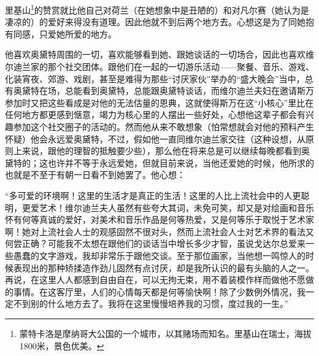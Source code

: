 里基山\footnote{蒙特卡洛是摩纳哥大公国的一个城市，以其赌场而知名。里基山在瑞士，海拔1800米，景色优美。}的赞赏就比他自己对荷兰（在她想象中是丑陋的）和对凡尔赛（她认为是凄凉的）的爱好来得没有道理。因此他就不到后两个地方去。心想这是为了同她抱有同感，只爱她所爱的地方。
\par 他喜欢奥黛特周围的一切，喜欢能够看到她、跟她谈话的一切场合，因此也喜欢维尔迪兰家的那个社交团体。跟他们在一起的一切游乐活动——聚餐、音乐、游戏、化装宵夜、郊游、戏剧，甚至是难得为那些“讨厌家伙”举办的“盛大晚会”当中，总有奥黛特在场，总能看到奥黛特，总能跟奥黛特谈话，而维尔迪兰夫妇在邀请斯万参加时又把这些看成是对他的无法估量的恩典，这就使得斯万在这“小核心”里比在任何地方都更感到惬意，竭力为核心里的人摆出一些好处，心想他这辈子都会有兴趣参加这个社交圈子的活动的。然而他从来不敢想象（怕常想就会对他的预料产生怀疑）他会永远爱奥黛特，不过，假如他一直同维尔迪兰家交往（这种设想，从原则上来说，跟他的理智的抵触要少些），那么他在将来总是可以继续每晚都看到奥黛特的；这也许并不等于永远爱她，但就目前来说，当他还爱她的时候，他所求的也就是不至于有朝一日看不到她罢了。他心想：
\par “多可爱的环境啊！这里的生活才是真正的生活！这里的人比上流社会中的人更聪明，更爱艺术！维尔迪兰夫人虽然有些夸大其词，未免可笑，却又是对绘画和音乐怀有何等真诚的爱好，对美术和音乐作品是何等热爱，又是何等乐于取悦于艺术家啊！她对上流社会人士的观感固然不很对头，然而上流社会人士对艺术界的看法又何尝正确？可能我不太想在跟他们的谈话当中增长多少才智，虽说戈达尔总爱来一些愚蠢的文字游戏，我却非常乐于跟他交谈。至于那位画家，当他想一鸣惊人的时候表现出的那种矫揉造作劲儿固然有点讨厌，却是我所认识的最有头脑的人之一。再说，在这里人人都感到自由自在，可以无拘无束，用不着装模作样而做他不愿做的事情。在这客厅里，人们的心情每天都是何等愉快啊！除了少数例外情况，我一定不到别的什么地方去了。我将在这里慢慢培养我的习惯，度过我的一生。”
